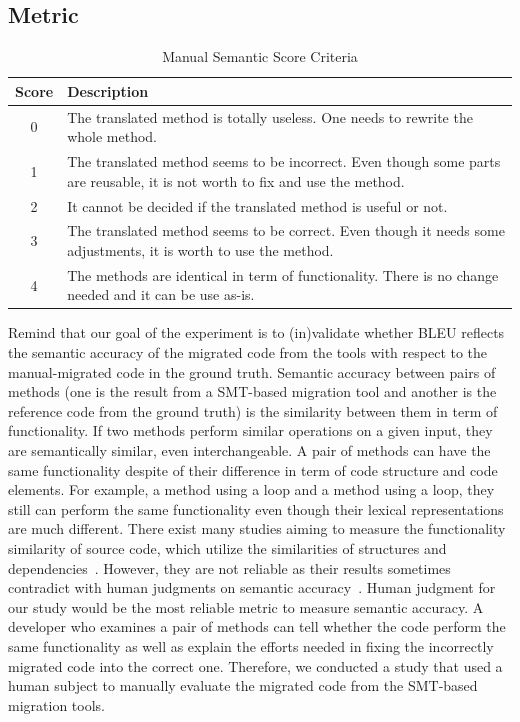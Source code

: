 \subsection{Metric} 
%
\begin{table}
\caption{Manual Semantic Score Criteria}
\begin{tabular}{|c|p{6.5cm}|}
\hline
Score & Description \\
\hline
0 & The translated method is totally useless. One needs to rewrite the whole method. \\
\hline
1 & The translated method seems to be incorrect. Even though some parts are reusable, it is not worth to fix and use the method. \\
\hline
2 &  It cannot be decided if the translated method is useful or not. \\
\hline
3 & The translated method seems to be correct. Even though it needs some adjustments, it is worth to use the method. \\
\hline
4 & The methods are identical in term of functionality. There is no change needed and it can be use as-is. \\
\hline
\end{tabular}
\label{table:criteria}
\end{table}

Remind that our goal of the experiment is to (in)validate whether BLEU
reflects the semantic accuracy of the migrated code from the tools
with respect to the manual-migrated code in the ground truth. Semantic accuracy between pairs of methods (one is the result from a
SMT-based migration tool and another is the reference code from the
ground truth) is the similarity between them in term of
functionality. If two methods perform similar operations on a given
input, they are semantically similar, even interchangeable. A pair of
methods can have the same functionality despite of their difference in
term of code structure and code elements.
%
For example, a method using a  loop and a method using a
 loop, they still can perform the same functionality even
though their lexical representations are much different. There exist
many studies aiming to measure the functionality similarity of source
code, which utilize the similarities of structures and
dependencies~\cite{clone-tse07,roy09,baker97,ccfinder,cpminer,deckard,deckard2,horwitz01}.
However, they are not reliable as their results sometimes contradict
with human judgments on semantic accuracy~\cite{deckard2}. 
%
Human judgment for our study would be the most reliable metric to
measure semantic accuracy. A developer who examines a pair of methods
can tell whether the code perform the same functionality as well as
explain the efforts needed in fixing the incorrectly migrated code
into the correct one. Therefore, we conducted a study that used a
human subject to manually evaluate the migrated code from the
SMT-based migration tools.

